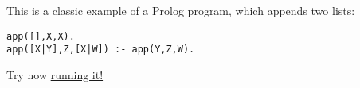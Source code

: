 \documentclass{article}
\begin{document}
\noindent
This is a classic example of a Prolog program, which appends two lists:

\begin{verbatim}
app([],X,X).
app([X|Y],Z,[X|W]) :- app(Y,Z,W).
\end{verbatim}

\noindent
Try now 
\href{https://ciao-lang.org/playground/?code=app(%5B%5D%2CX%2CX).%0Aapp(%5BX%7CY%5D%2CZ%2C%5BX%7CW%5D)%20%3A-%0A%20%20%20%20%20app(Y%2CZ%2CW).%0A}
{running it!}
\end{document}
